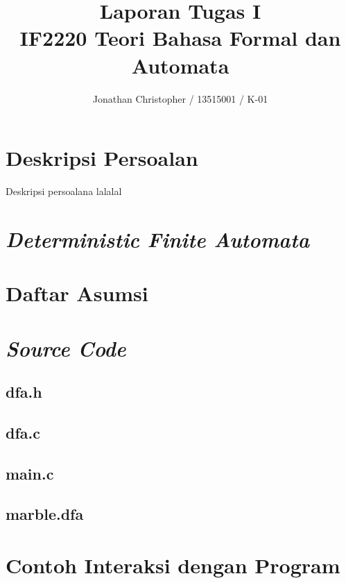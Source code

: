 \documentclass[11pt,a4paper,titlepage]{article}
\begin{document}
	\title{Laporan Tugas I \\ IF2220 Teori Bahasa Formal dan Automata}
	\author{Jonathan Christopher / 13515001 / K-01}
	\maketitle

	\section{Deskripsi Persoalan}

	Deskripsi persoalana lalalal

	\section{\textit{Deterministic Finite Automata}}

	\section{Daftar Asumsi}

	\section{\textit{Source Code}}

		\subsection{dfa.h}
			

		\subsection{dfa.c}
			

		\subsection{main.c}
			

		\subsection{marble.dfa}
			

	\section{Contoh Interaksi dengan Program}
\end{document}

